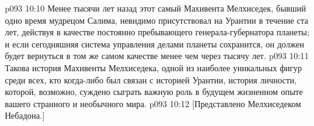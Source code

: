 \vs p093 10:10 Менее тысячи лет назад этот самый Махивента Мелхиседек, бывший одно время мудрецом Салима, невидимо присутствовал на Урантии в течение ста лет, действуя в качестве постоянно пребывающего генерала\hyp{}губернатора планеты; и если сегодняшняя система управления делами планеты сохранится, он должен будет вернуться в том же самом качестве менее чем через тысячу лет.
\vs p093 10:11 \pc Такова история Махивенты Мелхиседека, одной из наиболее уникальных фигур среди всех, кто когда\hyp{}либо был связан с историей Урантии, история личности, которой, возможно, суждено сыграть важную роль в будущем жизненном опыте вашего странного и необычного мира.
\vsetoff
\vs p093 10:12 [Представлено Мелхиседеком Небадона.]
